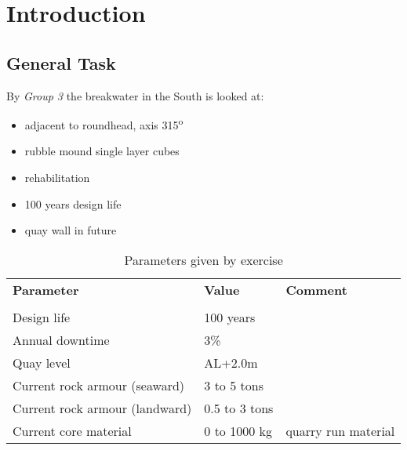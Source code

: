 \chapter{Introduction}

\section{General Task}

By \textit{Group 3} the breakwater in the South is looked at:
\begin{itemize}
 \item adjacent to roundhead, axis 315\textsuperscript{o}
 \item rubble mound single layer cubes
 \item rehabilitation
 \item 100 years design life
 \item quay wall in future
\end{itemize}

\begin{center}
\begin{table}[!htb]
\begin{tabu}{X[2l] X[1c] X[2c]}
\toprule[2pt]
\textbf{Parameter} & \textbf{Value} & \textbf{Comment}\\
\\
\midrule
Design life                    & 100 years     & \\
Annual downtime                & 3\%           & \\
Quay level                     & AL+2.0m       & \\
Current rock armour (seaward)  & 3 to 5 tons   & \\
Current rock armour (landward) & 0.5 to 3 tons & \\
Current core material          & 0 to 1000 kg  & quarry run material\\

\bottomrule[2pt]
\end{tabu}
\caption{Parameters given by exercise}
\label{tab:paramsExercise}
\end{table}
\end{center}